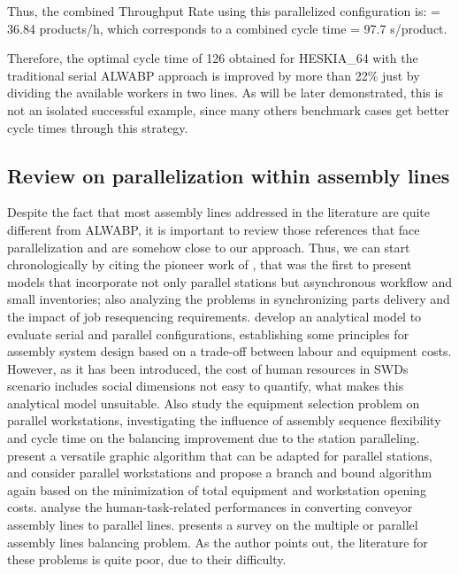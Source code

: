 \documentclass{singlecol-new}
\begin{document}
Thus, the combined Throughput Rate using this parallelized configuration is:
 = 36.84 products/h, which corresponds to a combined cycle time  = 97.7 s/product.

Therefore, the optimal cycle time of 126 obtained for HESKIA\_64 with the traditional serial ALWABP approach is improved by more than 22\% just by dividing the available workers in two lines. As will be later demonstrated, this is not an isolated successful example, since many others benchmark cases get better cycle times through this strategy.

\subsection{Review on parallelization within assembly lines}

Despite the fact that most assembly lines addressed in the literature are quite different from ALWABP, it is important to review those references that face parallelization and are somehow close to our approach. Thus, we can start chronologically by citing the pioneer work of \cite{buzacott1990abandoning}, that was the first to present models that incorporate not only parallel stations but asynchronous workflow and small inventories; also analyzing the problems in synchronizing parts delivery and the impact of job resequencing requirements. \cite{daganzo1994assembly} develop an analytical model to evaluate serial and parallel configurations, establishing some principles for assembly system design based on a trade-off between labour and equipment costs. However, as it has been introduced, the cost of human resources in SWDs scenario includes social dimensions not easy to quantify, what makes this analytical model unsuitable. Also \cite{bukchin03weighted} study the equipment selection problem on parallel workstations, investigating the influence of assembly sequence flexibility and cycle time on the balancing improvement due to the station paralleling. \cite{boysen08versatile} present a versatile graphic algorithm that can be adapted for parallel stations, and \cite{ege09assembly} consider parallel workstations and propose a branch and bound algorithm again based on the minimization of total equipment and workstation opening costs. \cite{kaku2008study} analyse the human-task-related performances in converting conveyor assembly lines to parallel lines. \cite{lusa2008survey} presents a survey on the multiple or parallel assembly lines balancing problem. As the author points out, the literature for these problems is quite poor, due to their difficulty.
\end{document}
